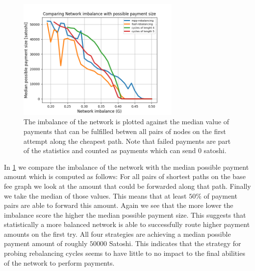 \documentclass[a4paper]{paper}
\begin{document}
\begin{figure}
 \centering
 \includegraphics[width=8cm]{code/vs/fig/imba_vs_median_payment_size.png}
 \caption{The imbalance of the network is plotted against the median value of payments that can be fulfilled betwen all pairs of nodes on the first attempt along the cheapest path. Note that failed payments are part of the statistics and counted as payments which can send $0$ satoshi.}
 \label{fig:imba_vs_payment_size}
\end{figure}

In \cref{fig:imba_vs_payment_size} we compare the imbalance of the network with the median possible payment amount which is computed as follows:
For all pairs of shortest paths on the base fee graph we look at the amount that could be forwarded along that path.
Finally we take the median of those values.
This means that at least $50\%$ of payment pairs are able to forward this amount.
Again we see that the more lower the imbalance score the higher the median possible payment size.
This suggests that statistically a more balanced network is able to successfully route higher payment amounts on the first try.
All four strategies are achieving a median possible payment amount of roughly $50000$ Satoshi.
This indicates that the strategy for probing rebalancing cycles seems to have little to no impact to the final abilities of the network to perform payments.


\end{document}
